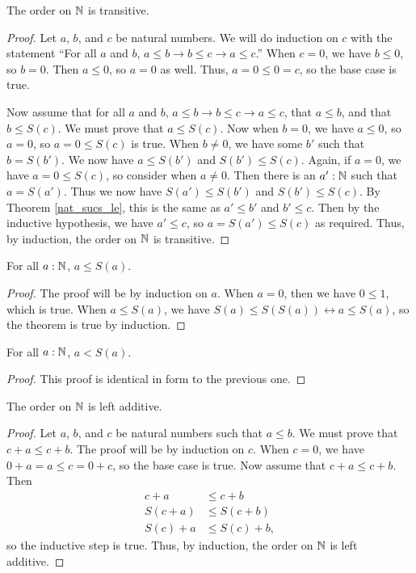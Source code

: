 \documentclass[../../math.tex]{subfiles}
\begin{document}
\begin{instance}
    The order on $\mathbb{N}$ is transitive.
\end{instance}
\begin{proof}
    Let $a$, $b$, and $c$ be natural numbers.  We will do induction on $c$ with
    the statement ``For all $a$ and $b$, $a \leq b \rightarrow b \leq c
    \rightarrow a \leq c$.''  When $c = 0$, we have $b \leq 0$, so $b = 0$.
    Then $a \leq 0$, so $a = 0$ as well.  Thus, $a = 0 \leq 0 = c$, so the base
    case is true.

    Now assume that for all $a$ and $b$, $a \leq b \rightarrow b \leq c
    \rightarrow a \leq c$, that $a \leq b$, and that $b \leq S(c)$.  We must
    prove that $a \leq S(c)$.  Now when $b = 0$, we have $a \leq 0$, so $a = 0$,
    so $a = 0 \leq S(c)$ is true.  When $b \neq 0$, we have some $b'$ such that
    $b = S(b')$.  We now have $a \leq S(b')$ and $S(b') \leq S(c)$.  Again, if
    $a = 0$, we have $a = 0 \leq S(c)$, so consider when $a \neq 0$.  Then there
    is an $a' : \mathbb{N}$ such that $a = S(a')$.  Thus we now have $S(a') \leq S(b')$
    and $S(b') \leq S(c)$.  By Theorem \ref{nat_sucs_le}, this is the same as
    $a' \leq b'$ and $b' \leq c$.  Then by the inductive hypothesis, we have $a'
    \leq c$, so $a = S(a') \leq S(c)$ as required.  Thus, by induction, the
    order on $\mathbb{N}$ is transitive.
\end{proof}

\begin{theorem} \label{nat_le_suc}
    For all $a : \mathbb{N}$, $a \leq S(a)$.
\end{theorem}
\begin{proof}
    The proof will be by induction on $a$.  When $a = 0$, then we have $0 \leq
    1$, which is true.  When $a \leq S(a)$, we have $S(a) \leq S(S(a))
    \leftrightarrow a \leq S(a)$, so the theorem is true by induction.
\end{proof}

\begin{theorem} \label{nat_lt_suc}
    For all $a : \mathbb{N}$, $a < S(a)$.
\end{theorem}
\begin{proof}
    This proof is identical in form to the previous one.
\end{proof}

\begin{instance}
    The order on $\mathbb{N}$ is left additive.
\end{instance}
\begin{proof}
    Let $a$, $b$, and $c$ be natural numbers such that $a \leq b$.  We must
    prove that $c + a \leq c + b$.  The proof will be by induction on $c$.  When
    $c = 0$, we have $0 + a = a \leq c = 0 + c$, so the base case is true.  Now
    assume that $c + a \leq c + b$.  Then
    \begin{align*}
        c + a &\leq c + b \\
        S(c + a) &\leq S(c + b) \\
        S(c) + a &\leq S(c) + b,
    \end{align*}
    so the inductive step is true.  Thus, by induction, the order on $\mathbb{N}$ is
    left additive.
\end{proof}
\end{document}
